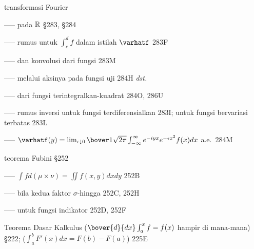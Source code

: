  transformasi Fourier

----- pada $\Bbb R$ \S283, \S284



----- rumus untuk $\int_c^df$ dalam istilah $\varhatf$ 283F

----- dan konvolusi dari fungsi 283M




----- melalui aksinya pada fungsi uji 284H {\it dst.}

----- dari fungsi terintegralkan-kuadrat 284O, 286U


----- rumus inversi untuk fungsi terdiferensialkan 283I; untuk fungsi bervariasi terbatas 283L


----- $\varhatf(y)=\lim_{\epsilon\downarrow 0}
  \bover1{\sqrt{2\pi}}\int_{-\infty}^{\infty}
  e^{-iyx}e^{-\epsilon x^2}f(x)dx$ a.e.\ 284M



















 teorema Fubini \S252

----- $\int fd(\mu\times\nu)=\iint f(x,y)dxdy$ 252B

----- bila kedua faktor $\sigma$-hingga 252C, 252H

----- untuk fungsi indikator 252D, 252F





 Teorema Dasar Kalkulus ($\bover{d}{dx}\int_a^xf=f(x)$ hampir di mana-mana) \S222; ($\int_a^bF'(x)dx=F(b)-F(a)$) 225E


\indexmedskip
















\indexmedskip




















